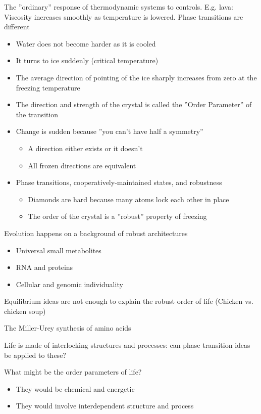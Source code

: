 \documentclass[]{article}
\begin{document}
The ''ordinary'' response of thermodynamic systems to controls. E.g. lava: Viscosity increases smoothly as temperature is lowered. Phase transitions are different
\begin{itemize}
	\item Water does not become harder as it is cooled
	\item It turns to ice suddenly (critical temperature)
	\item The average direction of pointing of the ice sharply increases from zero at the freezing temperature
	\item The direction and strength of the crystal is called the ''Order 	Parameter'' of the transition
	\item Change is sudden because ''you can’t have half a symmetry''
	\begin{itemize}
		\item A direction either exists or it doesn’t
		\item All frozen directions are equivalent
	\end{itemize}
	\item Phase transitions, cooperatively-maintained states, and robustness
	\begin{itemize}
		\item Diamonds are hard because many atoms lock each other in place
		\item The order of the crystal is a ''robust'' property of freezing
	\end{itemize}
\end{itemize}

Evolution happens on a background of robust architectures
\begin{itemize}
	\item Universal small metabolites
	\item RNA and proteins
	\item Cellular and genomic individuality
\end{itemize}

Equilibrium ideas are not enough to explain the robust order of life (Chicken vs. chicken soup)


The Miller-Urey synthesis of amino acids\cite{miller1959organic}

Life is made of interlocking structures and processes: can phase transition ideas
be applied to these?

What might be the order parameters of life?

\begin{itemize}
	\item They would be chemical and energetic
	\item They would involve interdependent	structure and process
\end{itemize}
\end{document}
